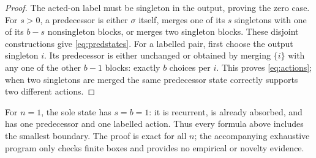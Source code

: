 \documentclass[a4paper,10pt]{amsart}
\theoremstyle{remark}
\begin{document}
\begin{proof}
The acted-on label must be singleton in the output, proving the zero case.
For $s>0$, a predecessor is either $\sigma$ itself, merges one of its $s$
singletons with one of its $b-s$ nonsingleton blocks, or merges two singleton
blocks.  These disjoint constructions give \eqref{eq:predstates}.  For a
labelled pair, first choose the output singleton $i$.  Its predecessor is
either unchanged or obtained by merging $\{i\}$ with any one of the other
$b-1$ blocks: exactly $b$ choices per $i$.  This proves \eqref{eq:actions};
when two singletons are merged the same predecessor state correctly supports
two different actions.
\end{proof}

For $n=1$, the sole state has $s=b=1$: it is recurrent, is already absorbed,
and has one predecessor and one labelled action.  Thus every formula above
includes the smallest boundary.  The proof is exact for all $n$; the
accompanying exhaustive program only checks finite boxes and provides no
empirical or novelty evidence.



\end{document}
